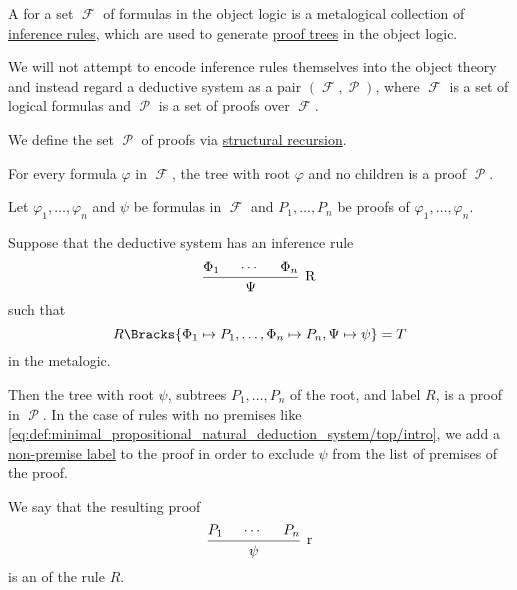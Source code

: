 \begin{definition}\label{def:deductive_system}\mimprovised
  A  for a set \( \mscrF \) of formulas in the object logic is a metalogical collection of \hyperref[def:judgment/inference_rule]{inference rules}, which are used to generate \hyperref[def:proof_tree]{proof trees} in the object logic.

  We will not attempt to encode inference rules themselves into the object theory and instead regard a deductive system as a pair \( (\mscrF, \mscrP) \), where \( \mscrF \) is a set of logical formulas and \( \mscrP \) is a set of proofs over \( \mscrF \).

  We define the set \( \mscrP \) of proofs via \hyperref[thm:structural_recursion]{structural recursion}.
  \begin{thmenum}
     For every formula \( \varphi \) in \( \mscrF \), the tree with root \( \varphi \) and no children is a proof \( \mscrP \).

     Let \( \varphi_1, \ldots, \varphi_n \) and \( \psi \) be formulas in \( \mscrF \) and \( P_1, \ldots, P_n \) be proofs of \( \varphi_1, \ldots, \varphi_n \).

    Suppose that the deductive system has an inference rule
    \begin{equation*}
      \begin{prooftree}
        \hypo{ \Phi_1 }
        \hypo{ \cdots }
        \hypo{ \Phi_n }
        \infer3[R]{ \Psi }
      \end{prooftree}
    \end{equation*}
    such that
    \begin{equation*}
      R\Bracks{ \Phi_1 \mapsto P_1, \ldots, \Phi_n \mapsto P_n, \Psi \mapsto \psi } = T
    \end{equation*}
    in the metalogic.

    Then the tree with root \( \psi \), subtrees \( P_1, \ldots, P_n \) of the root, and label \( R \), is a proof in \( \mscrP \). In the case of rules with no premises like \eqref{eq:def:minimal_propositional_natural_deduction_system/top/intro}, we add a \hyperref[def:proof_tree/premises]{non-premise label} to the proof in order to exclude \( \psi \) from the list of premises of the proof.

    We say that the resulting proof
    \begin{equation*}
      \begin{prooftree}
        \hypo{ P_1 }
        \hypo{ \cdots }
        \hypo{ P_n }
        \infer3[r]{ \psi }
      \end{prooftree}
    \end{equation*}
    is an  of the rule \( R \).
  \end{thmenum}
\end{definition}

